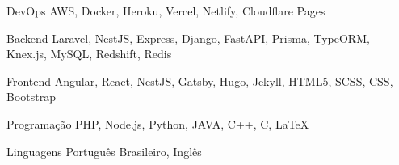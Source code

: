 

\begin{cvskills}

  \cvskill
    {DevOps} %
    {AWS, Docker, Heroku, Vercel, Netlify, Cloudflare Pages} %

  \cvskill
    {Backend} %
    {Laravel, NestJS, Express, Django, FastAPI, Prisma, TypeORM, Knex.js, MySQL, Redshift, Redis} %

  \cvskill
    {Frontend} %
    {Angular, React, NestJS, Gatsby, Hugo, Jekyll, HTML5, SCSS, CSS, Bootstrap} %

  \cvskill
    {Programação} %
    {PHP, Node.js, Python, JAVA, C++, C, LaTeX} %

  \cvskill
    {Linguagens} %
    {Português Brasileiro, Inglês} %

\end{cvskills}
